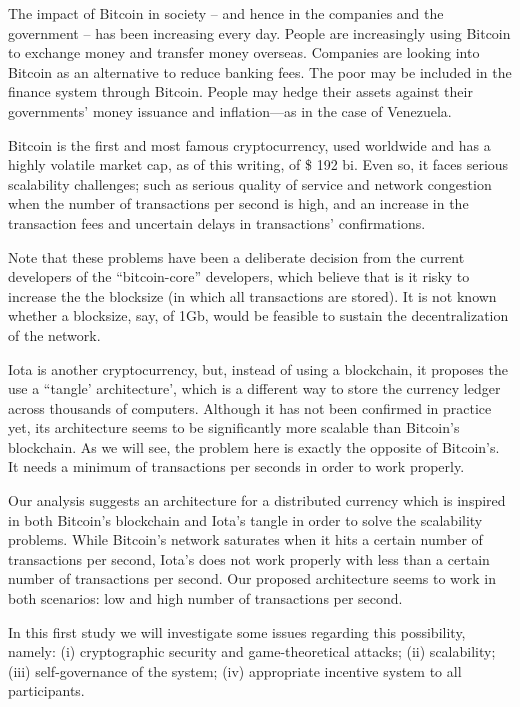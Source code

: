 The impact of Bitcoin in society -- and hence in the companies and the government -- has been increasing every day. People are increasingly using Bitcoin to exchange money and transfer money overseas. Companies are looking into Bitcoin as an alternative to reduce banking fees. The poor may be included in the finance system through Bitcoin. People may hedge their assets against their governments' money issuance and inflation---as in the case of Venezuela.

Bitcoin is the first and most famous cryptocurrency, used worldwide and has a highly volatile market cap, as of this writing, of \$ 192 bi. Even so, it faces serious scalability challenges; such as serious quality of service and network congestion when the number of transactions per second is high, and an increase in the transaction fees and uncertain delays in transactions' confirmations.

Note that these problems have been a deliberate decision from the current developers of the ``bitcoin-core'' developers, which believe that is it risky to increase the the blocksize (in which all transactions are stored).  It is not known whether a blocksize, say, of 1Gb, would be feasible to sustain the decentralization of the network. 

Iota is another cryptocurrency, but, instead of using a blockchain, it proposes the use a ``tangle' architecture', which is a different way to store the currency ledger across thousands of computers. Although it has not been confirmed in practice yet, its architecture seems to be significantly more scalable than Bitcoin's blockchain. As we will see, the problem here is exactly the opposite of Bitcoin's. It needs a minimum of transactions per seconds in order to work properly.

Our analysis suggests an architecture for a distributed currency which is inspired in both Bitcoin's blockchain and Iota's tangle in order to solve the scalability problems. While Bitcoin's network saturates when it hits a certain number of transactions per second, Iota's does not work properly with less than a certain number of transactions per second. Our proposed architecture seems to work in both scenarios: low and high number of transactions per second.

In this first study we will investigate some issues regarding this possibility, namely: (i) cryptographic security and game-theoretical attacks; (ii) scalability; (iii) self-governance of the system; (iv) appropriate incentive system to all participants.

